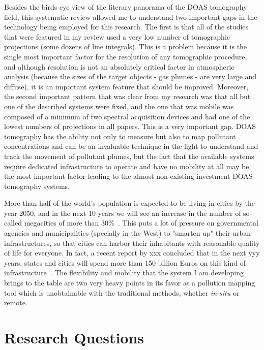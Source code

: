 Besides the birds eye view of the literary panorama of the DOAS
tomography field, this systematic review allowed me to understand two
important gaps in the technology being employed for this research. The
first is that all of the studies that were featured in my review used a
very low number of tomographic projections (some dozens of line
integrals). This is a problem because it is the single most important
factor for the resolution of any tomographic procedure, and although
resolution is not an absolutely critical factor in atmospheric analysis
(because the sizes of the target objects - gas plumes - are very large
and diffuse), it is an important system feature that should be improved.
Moreover, the second important pattern that was clear from my research
was that all but one of the described systems were fixed, and the one
that was mobile was composed of a minimum of two spectral acquisition
devices and had one of the lowest numbers of projections in all papers.
This is a very important gap. DOAS tomography has the ability not only
to measure but also to map pollutant concentrations and can be an
invaluable technique in the fight to understand and track the movement
of pollutant plumes, but the fact that the available systems require
dedicated infrastructure to operate and have no mobility at all may be
the most important factor leading to the almost non-existing investment
DOAS tomography systems.

More than half of the world's population is expected to be living in
cities by the year 2050, and in the next 10 years we will see an
increase in the number of so-called megacities of more than
30\%~\cite{CABI2019}. This puts a lot of pressure on governmental
agencies and municipalities (specially in the West) to "smarten up"
their urban infrastructures, so that cities can harbor their inhabitants
with reasonable quality of life for everyone. In fact, a recent report
by xxx concluded that in the next yyy years, states and cities will
spend more than 150 billion Euros on this kind of
infrastructure~. The flexibility and mobility
that the system I am developing brings to the table are two very heavy
points in its favor as a pollution mapping tool which is unobtainable
with the traditional methods, whether \emph{in-situ} or remote.


\section{Research Questions}%
\label{sec:research_questions}

